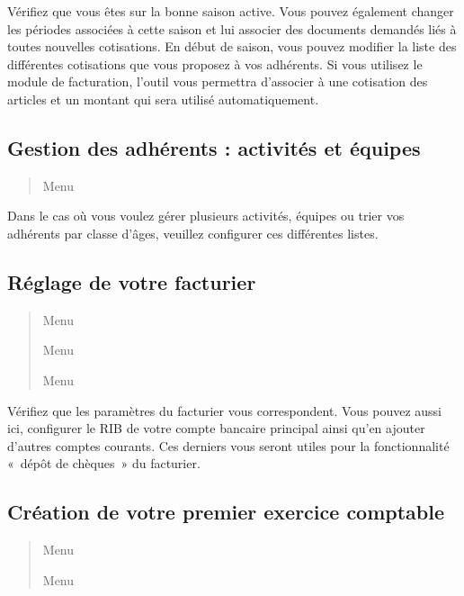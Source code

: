 \documentclass[a4paper,10pt,oneside,french]{sphinxmanual}
\begin{document}
\sphinxAtStartPar
Vérifiez que vous êtes sur la bonne saison active. Vous pouvez également changer les périodes associées à cette saison et lui associer des documents demandés liés à toutes nouvelles cotisations.
En début de saison, vous pouvez modifier la liste des différentes cotisations que vous proposez à vos adhérents.
Si vous utilisez le module de facturation, l’outil vous permettra d’associer à une cotisation des articles et un montant qui sera utilisé automatiquement.


\subsection{Gestion des adhérents : activités et équipes}
\label{\detokenize{asso/first_step:gestion-des-adherents-activites-et-equipes}}\begin{quote}

\sphinxAtStartPar
Menu 
\end{quote}

\sphinxAtStartPar
Dans le cas où vous voulez gérer plusieurs activités, équipes ou trier vos adhérents par classe d’âges, veuillez configurer ces différentes listes.


\subsection{Réglage de votre facturier}
\label{\detokenize{asso/first_step:reglage-de-votre-facturier}}\begin{quote}

\sphinxAtStartPar
Menu 

\sphinxAtStartPar
Menu 

\sphinxAtStartPar
Menu 
\end{quote}

\sphinxAtStartPar
Vérifiez que les paramètres du facturier vous correspondent.
Vous pouvez aussi ici, configurer le RIB de votre compte bancaire principal ainsi qu’en ajouter d’autres comptes courants.
Ces derniers vous seront utiles pour la fonctionnalité « dépôt de chèques » du facturier.


\subsection{Création de votre premier exercice comptable}
\label{\detokenize{asso/first_step:creation-de-votre-premier-exercice-comptable}}\begin{quote}

\sphinxAtStartPar
Menu 

\sphinxAtStartPar
Menu 
\end{quote}
\end{document}
